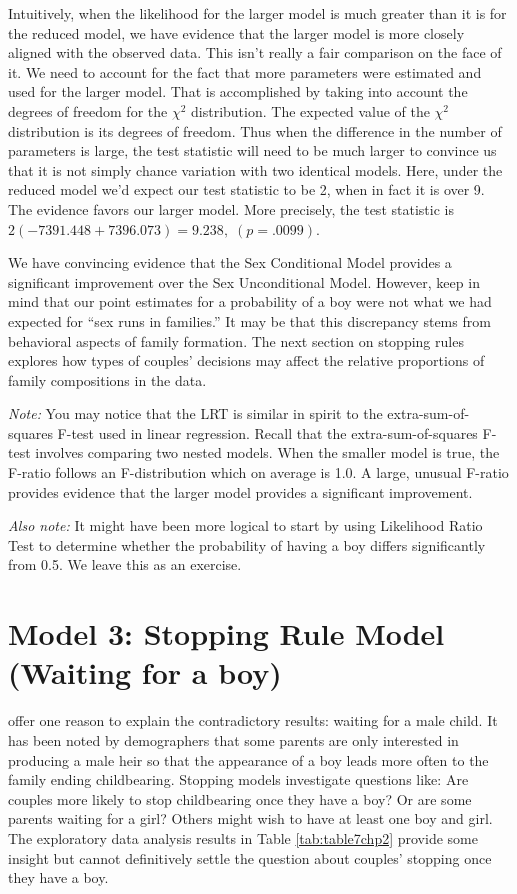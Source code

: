 \documentclass[
]{krantz}
\begin{document}
Intuitively, when the likelihood for the larger model is much greater than it is for the reduced model, we have evidence that the larger model is more closely aligned with the observed data. This isn't really a fair comparison on the face of it. We need to account for the fact that more parameters were estimated and used for the larger model. That is accomplished by taking into account the degrees of freedom for the \(\chi^2\) distribution. The expected value of the \(\chi^2\) distribution is its degrees of freedom. Thus when the difference in the number of parameters is large, the test statistic will need to be much larger to convince us that it is not simply chance variation with two identical models. Here, under the reduced model we'd expect our test statistic to be 2, when in fact it is over 9. The evidence favors our larger model. More precisely, the test statistic is \(2(-7391.448+7396.073) = 9.238,\; (p=.0099)\).

We have convincing evidence that the Sex Conditional Model provides a significant improvement over the Sex Unconditional Model. However, keep in mind that our point estimates for a probability of a boy were not what we had expected for ``sex runs in families.'' It may be that this discrepancy stems from behavioral aspects of family formation. The next section on stopping rules explores how types of couples' decisions may affect the relative proportions of family compositions in the data.

\emph{Note: }You may notice that the LRT is similar in spirit to the extra-sum-of-squares F-test used in linear regression. Recall that the extra-sum-of-squares F-test involves comparing two nested models. When the smaller model is true, the F-ratio follows an F-distribution which on average is 1.0. A large, unusual F-ratio provides evidence that the larger model provides a significant improvement.

\emph{Also note: } It might have been more logical to start by using Likelihood Ratio Test to determine whether the probability of having a boy differs significantly from 0.5. We leave this as an exercise.

\hypertarget{model-3-stopping-rule-model-waiting-for-a-boy}{%
\section{Model 3: Stopping Rule Model (Waiting for a boy)}\label{model-3-stopping-rule-model-waiting-for-a-boy}}

\citet{Rodgers2001} offer one reason to explain the contradictory results: waiting for a male child. It has been noted by demographers that some parents are only interested in producing a male heir so that the appearance of a boy leads more often to the family ending childbearing. Stopping models investigate questions like: Are couples more likely to stop childbearing once they have a boy? Or are some parents waiting for a girl? Others might wish to have at least one boy and girl. The exploratory data analysis results in Table \ref{tab:table7chp2} provide some insight but cannot definitively settle the question about couples' stopping once they have a boy.
\end{document}
